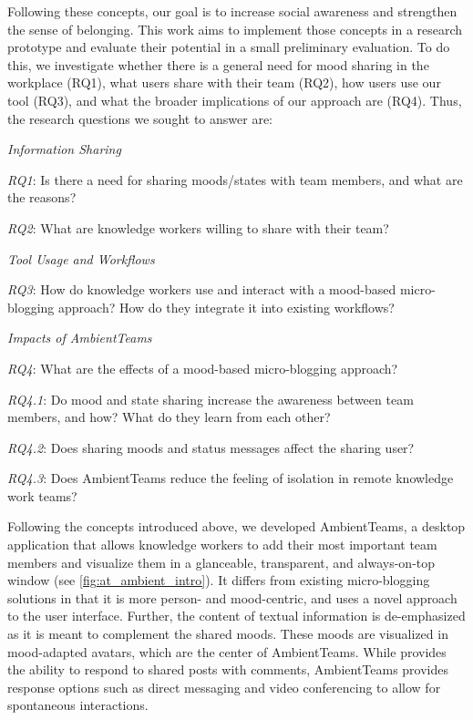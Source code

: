Following these concepts, our goal is to increase social awareness and strengthen the sense of belonging. This work aims to implement those concepts in a research prototype and evaluate their potential in a small preliminary evaluation. To do this, we investigate whether there is a general need for mood sharing in the workplace (RQ1), what users share with their team (RQ2), how users use our tool (RQ3), and what the broader implications of our approach are (RQ4). Thus, the research questions we sought to answer are:

\bigskip\noindent\textit{Information Sharing}

\smallskip\noindent\textit{RQ1}: Is there a need for sharing moods/states with team members, and what are the reasons?

\smallskip\noindent\textit{RQ2}: What are knowledge workers willing to share with their team?

\medskip\noindent\textit{Tool Usage and Workflows}

\smallskip\noindent\textit{RQ3}: How do knowledge workers use and interact with a mood-based micro-blogging approach? How do they integrate it into existing workflows?

\medskip\noindent\textit{Impacts of AmbientTeams}

\smallskip\noindent\textit{RQ4}: What are the effects of  a mood-based micro-blogging approach?

\setlength{\leftskip}{0.5cm}
\smallskip\noindent\textit{RQ4.1}: Do mood and state sharing increase the awareness between team members, and how? What do they learn from each other?

\smallskip\noindent\textit{RQ4.2}: Does sharing moods and status messages affect the sharing user?

\smallskip\noindent\textit{RQ4.3}: Does AmbientTeams reduce the feeling of isolation in remote knowledge work teams?


\setlength{\leftskip}{0pt}

\bigskip\noindent Following the concepts introduced above, we developed AmbientTeams, a desktop application that allows knowledge workers to add their most important team members and visualize them in a glanceable, transparent, and always-on-top window (see \autoref{fig:at_ambient_intro}). It differs from existing micro-blogging solutions in that it is more person- and mood-centric, and uses a novel approach to the user interface. Further, the content of textual information is de-emphasized as it is meant to complement the shared moods. These moods are visualized in mood-adapted avatars, which are the center of AmbientTeams. While \textcite{dullemond2013fixing} provides the ability to respond to shared posts with comments, AmbientTeams provides response options such as direct messaging and video conferencing to allow for spontaneous interactions. 

